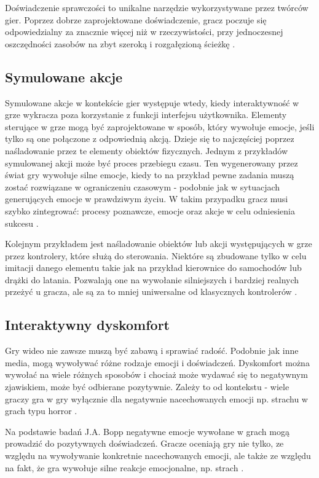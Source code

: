 Doświadczenie sprawczości to unikalne narzędzie wykorzystywane przez twórców gier. Poprzez dobrze zaprojektowane doświadczenie, gracz poczuje się odpowiedzialny za znacznie więcej niż w rzeczywistości, przy jednoczesnej oszczędności zasobów na zbyt szeroką i rozgałęzioną ścieżkę  \citep{button}.

\subsection{Symulowane akcje}

Symulowane akcje w kontekście gier występuje wtedy, kiedy interaktywność w grze wykracza poza korzystanie z funkcji interfejsu użytkownika. Elementy sterujące w grze mogą być zaprojektowane w sposób, który wywołuje emocje, jeśli tylko są one połączone z odpowiednią akcją. Dzieje się to najczęściej poprzez naśladowanie przez te elementy obiektów fizycznych. Jednym z przykładów symulowanej akcji może być proces przebiegu czasu. Ten wygenerowany przez świat gry wywołuje silne emocje, kiedy to na przykład pewne zadania muszą zostać rozwiązane w ograniczeniu czasowym - podobnie jak w sytuacjach generujących emocje w prawdziwym życiu. W takim przypadku gracz musi szybko zintegrować: procesy poznawcze, emocje oraz akcje w celu odniesienia sukcesu \citep{button}.

Kolejnym przykładem jest naśladowanie obiektów lub akcji występujących w grze przez kontrolery, które służą do sterowania. Niektóre są zbudowane tylko w celu imitacji danego elementu takie jak na przykład kierownice do samochodów lub drążki do latania. Pozwalają one na wywołanie silniejszych i bardziej realnych przeżyć u gracza, ale są za to mniej uniwersalne od klasycznych kontrolerów \citep{button}.

\subsection{Interaktywny dyskomfort}

Gry wideo nie zawsze muszą być zabawą i sprawiać radość. Podobnie jak inne media, mogą wywoływać różne rodzaje emocji i doświadczeń. Dyskomfort można wywołać na wiele różnych sposobów i chociaż może wydawać się to negatywnym zjawiskiem, może być odbierane pozytywnie. Zależy to od kontekstu - wiele graczy gra w gry wyłącznie dla negatywnie nacechowanych emocji np. strachu w grach typu horror \citep{button}.

Na podstawie badań J.A. Bopp negatywne emocje wywołane w grach mogą prowadzić do pozytywnych doświadczeń. Gracze oceniają gry nie tylko, ze względu na wywoływanie konkretnie nacechowanych emocji, ale także ze względu na fakt, że gra wywołuje silne reakcje emocjonalne, np. strach \citep{negativeemotions}.


